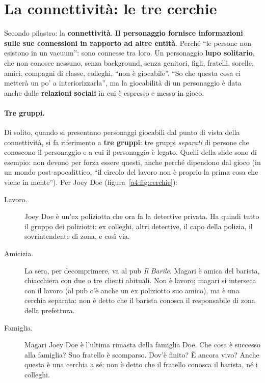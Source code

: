 \section{La connettività: le tre cerchie}
\label{a4:sec:connettivita}



Secondo pilastro: la \textbf{connettività}. \textbf{Il personaggio fornisce
informazioni sulle sue connessioni in rapporto ad altre entità}. Perché ``le
persone non esistono in un vacuum'': sono connesse tra loro. Un personaggio
\textbf{lupo solitario}, che non conosce nessuno, senza background, senza genitori,
figli, fratelli, sorelle, amici, compagni di classe, colleghi, ``non è giocabile''.
``So che questa cosa ci metterà un po' a interiorizzarla'', ma la giocabilità di un
personaggio è data anche dalle \textbf{relazioni sociali} in cui è espresso e
messo in gioco.

\paragraph{Tre gruppi.} Di solito, quando si presentano personaggi giocabili dal
punto di vista della connettività, si fa riferimento a \textbf{tre gruppi}: tre
gruppi \emph{separati} di persone che conoscono il personaggio e a cui il
personaggio è legato. Quelli della slide sono di esempio: non devono per forza
essere questi, anche perché dipendono dal gioco (in un mondo post-apocalittico,
``il circolo del lavoro non è proprio la prima cosa che viene in mente''). Per
Joey Doe (figura~\ref{a4:fig:cerchie}):
\begin{description}
  \item[Lavoro.] Joey Doe è un'ex poliziotta che ora fa la detective privata. Ha
        quindi tutto il gruppo dei poliziotti: ex colleghi, altri detective, il capo
        della polizia, il sovrintendente di zona, e così via.
  \item[Amicizia.] La sera, per decomprimere, va al pub \emph{Il Barile}. Magari è
        amica del barista, chiacchiera con due o tre clienti abituali. Non è
        lavoro; magari si interseca con il lavoro (al pub c'è anche un ex poliziotto
        suo amico), ma è una cerchia separata: non è detto che il barista conosca
        il responsabile di zona della prefettura.
  \item[Famiglia.] Magari Joey Doe è l'ultima rimasta della famiglia Doe. Che cosa è
        successo alla famiglia? Suo fratello è scomparso. Dov'è finito? È ancora
        vivo? Anche questa è una cerchia a sé: non è detto che il fratello conosca
        il barista, né i colleghi.
\end{description}

